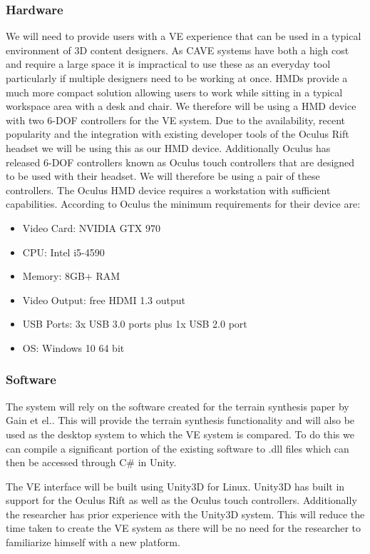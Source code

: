 \documentclass{sig-alternate-05-2015}
\begin{document}
\subsubsection{Hardware}
We will need to provide users with a VE experience that can be used in a typical environment of 3D content designers. As CAVE systems have both a high cost and require a large space it is impractical to use these as an everyday tool particularly if multiple designers need to be working at once. HMDs provide a much more compact solution allowing users to work while sitting in a typical workspace area with a desk and chair. We therefore will be using a HMD device with two 6-DOF controllers for the VE system. Due to the availability, recent popularity and the integration with existing developer tools of the Oculus Rift headset we will be using this as our HMD device. Additionally Oculus has released 6-DOF controllers known as Oculus touch controllers that are designed to be used with their headset\cite{Oculus}. We will therefore be using a pair of these controllers. The Oculus HMD device requires a workstation with sufficient capabilities. According to Oculus the minimum requirements for their device are\cite{Oculus}:
\begin{itemize}
\item Video Card:  NVIDIA GTX 970
\item CPU: Intel i5-4590
\item Memory:  8GB+ RAM
\item Video Output:  free HDMI 1.3 output
\item USB Ports:  3x USB 3.0 ports plus 1x USB 2.0 port
\item OS: Windows 10 64 bit
\end{itemize}
\subsubsection{Software}
The system will rely on the software created for the terrain synthesis paper by Gain et el.\cite{Gain2015}. This will provide the terrain synthesis functionality and will also be used as the desktop system to which the VE system is compared. To do this we can compile a significant portion of the existing software to .dll files which can then be accessed through C\# in Unity. 

The VE interface will be built using Unity3D for Linux. Unity3D has built in support for the Oculus Rift as well as the Oculus touch controllers. Additionally the researcher has prior experience with the Unity3D system. This will reduce the time taken to create the VE system as there will be no need for the researcher to familiarize himself with a new platform.
\end{document}
